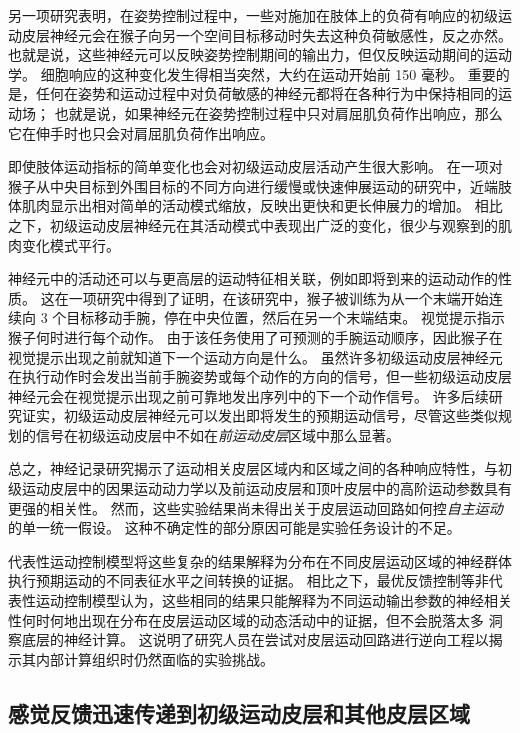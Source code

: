 另一项研究表明，在姿势控制过程中，一些对施加在肢体上的负荷有响应的初级运动皮层神经元会在猴子向另一个空间目标移动时失去这种负荷敏感性，反之亦然。
也就是说，这些神经元可以反映姿势控制期间的输出力，但仅反映运动期间的运动学。
细胞响应的这种变化发生得相当突然，大约在运动开始前 150 毫秒。
重要的是，任何在姿势和运动过程中对负荷敏感的神经元都将在各种行为中保持相同的运动场；
也就是说，如果神经元在姿势控制过程中只对肩屈肌负荷作出响应，那么它在伸手时也只会对肩屈肌负荷作出响应。


即使肢体运动指标的简单变化也会对初级运动皮层活动产生很大影响。
在一项对猴子从中央目标到外围目标的不同方向进行缓慢或快速伸展运动的研究中，近端肢体肌肉显示出相对简单的活动模式缩放，反映出更快和更长伸展力的增加。
相比之下，初级运动皮层神经元在其活动模式中表现出广泛的变化，很少与观察到的肌肉变化模式平行。


神经元中的活动还可以与更高层的运动特征相关联，例如即将到来的运动动作的性质。 
这在一项研究中得到了证明，在该研究中，猴子被训练为从一个末端开始连续向 3 个目标移动手腕，停在中央位置，然后在另一个末端结束。
视觉提示指示猴子何时进行每个动作。
由于该任务使用了可预测的手腕运动顺序，因此猴子在视觉提示出现之前就知道下一个运动方向是什么。
虽然许多初级运动皮层神经元在执行动作时会发出当前手腕姿势或每个动作的方向的信号，但一些初级运动皮层神经元会在视觉提示出现之前可靠地发出序列中的下一个动作信号。
许多后续研究证实，初级运动皮层神经元可以发出即将发生的预期运动信号，尽管这些类似规划的信号在初级运动皮层中不如在\textit{前运动皮层}区域中那么显著。


总之，神经记录研究揭示了运动相关皮层区域内和区域之间的各种响应特性，与初级运动皮层中的因果运动动力学以及前运动皮层和顶叶皮层中的高阶运动参数具有更强的相关性。
然而，这些实验结果尚未得出关于皮层运动回路如何控\textit{自主运动}的单一统一假设。
这种不确定性的部分原因可能是实验任务设计的不足。


代表性运动控制模型将这些复杂的结果解释为分布在不同皮层运动区域的神经群体执行预期运动的不同表征水平之间转换的证据。
相比之下，最优反馈控制等非代表性运动控制模型认为，这些相同的结果只能解释为不同运动输出参数的神经相关性何时何地出现在分布在皮层运动区域的动态活动中的证据，但不会脱落太多 洞察底层的神经计算。
这说明了研究人员在尝试对皮层运动回路进行逆向工程以揭示其内部计算组织时仍然面临的实验挑战。



\subsection{感觉反馈迅速传递到初级运动皮层和其他皮层区域}

